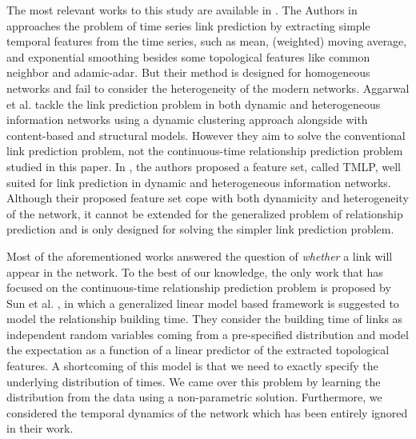 The most relevant works to this study are available in \cite{hajibagheri2016leveraging, aggarwal2012dynamic, sett2017temporal, sun2012will}. The Authors in \cite{hajibagheri2016leveraging} approaches the problem of time series link prediction by extracting simple temporal features from the time series, such as mean, (weighted) moving average, and exponential smoothing besides some topological features like common neighbor and adamic-adar. But their method is designed for homogeneous networks and fail to consider the heterogeneity of the modern networks. Aggarwal et al. \cite{aggarwal2012dynamic} tackle the link prediction problem in both dynamic and heterogeneous information networks using a dynamic clustering approach alongside with content-based and structural models. However they aim to solve the conventional link prediction problem, not the continuous-time relationship prediction problem studied in this paper. In \cite{sett2017temporal}, the authors proposed a feature set, called TMLP, well suited for link prediction in dynamic and heterogeneous information networks. Although their proposed feature set cope with both dynamicity and heterogeneity of the network, it cannot be extended for the generalized problem of relationship prediction and is only designed for solving the simpler link prediction problem.

Most of the aforementioned works answered the question of \emph{whether} a link will appear in the network. To the best of our knowledge, the only work that has focused on the continuous-time relationship prediction problem is proposed by Sun et al. \cite{sun2012will}, in which a generalized linear model based framework is suggested to model the relationship building time. They consider the building time of links as independent random variables coming from a pre-specified distribution and model the expectation as a function of a linear predictor of the extracted topological features. A shortcoming of this model is that we need to exactly specify the underlying distribution of times. We came over this problem by learning the distribution from the data using a non-parametric solution. Furthermore, we considered the temporal dynamics of the network which has been entirely ignored in their work.